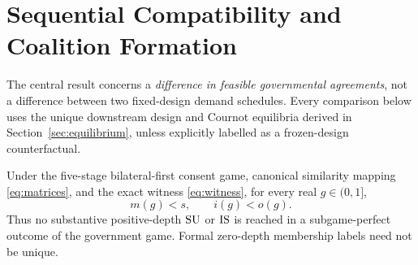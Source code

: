 \section{Sequential Compatibility and Coalition Formation}
\label{sec:results}

The central result concerns a \emph{difference in feasible
governmental agreements}, not a difference between two
fixed-design demand schedules. Every comparison below uses the
unique downstream design and Cournot equilibria derived in
Section~\ref{sec:equilibrium}, unless explicitly labelled
as a frozen-design counterfactual.

\begin{proposition}
\label{prop:rejection}
Under the five-stage bilateral-first consent game, canonical
similarity mapping \eqref{eq:matrices}, and the exact witness
\eqref{eq:witness}, for every real $g\in(0,1]$,
\begin{equation}\label{eq:rejection}
 m(g)<s,\qquad i(g)<o(g).
\end{equation}
Thus no substantive positive-depth $\mathrm{SU}$ or $\mathrm{IS}$ is reached
in a subgame-perfect outcome of the government game.
Formal zero-depth membership labels need not be unique.
\end{proposition}

